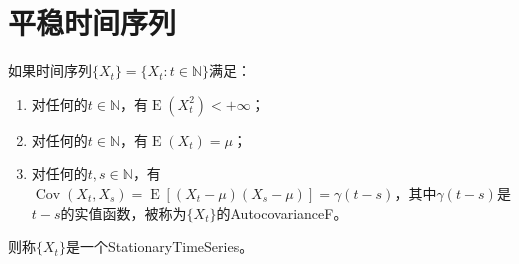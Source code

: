 \section{平稳时间序列}

\begin{definition}
	如果时间序列$\{X_t\}=\{X_t:t\in\mathbb{N}\}$满足：
	\begin{enumerate}
		\item 对任何的$t\in\mathbb{N}$，有$\operatorname{E}(X_t^2)<+\infty$；
		\item 对任何的$t\in\mathbb{N}$，有$\operatorname{E}(X_t)=\mu$；
		\item 对任何的$t,s\in\mathbb{N}$，有$\operatorname{Cov}(X_t,X_s)=\operatorname{E}[(X_t-\mu)(X_s-\mu)]=\gamma(t-s)$，其中$\gamma(t-s)$是$t-s$的实值函数，被称为$\{X_t\}$的\gls{AutocovarianceF}。
	\end{enumerate}
	则称$\{X_t\}$是一个\gls{StationaryTimeSeries}。
\end{definition}
